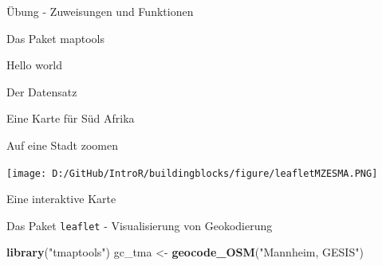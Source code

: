 \documentclass[ignorenonframetext,]{beamer}
\newenvironment{Shaded}{\begin{snugshade}}{\end{snugshade}}
\newcommand{\DataTypeTok}[1]{\textcolor[rgb]{0.74,0.68,0.62}{\underline{#1}}}
\newcommand{\FloatTok}[1]{\textcolor[rgb]{0.27,0.67,0.26}{#1}}
\newcommand{\KeywordTok}[1]{\textcolor[rgb]{0.26,0.66,0.93}{\textbf{#1}}}
\newcommand{\NormalTok}[1]{\textcolor[rgb]{0.74,0.68,0.62}{#1}}
\newcommand{\OperatorTok}[1]{\textcolor[rgb]{0.74,0.68,0.62}{#1}}
\newcommand{\StringTok}[1]{\textcolor[rgb]{0.02,0.61,0.04}{#1}}
\begin{document}
\begin{frame}[fragile]{Übung - Zuweisungen und Funktionen}
\begin{frame}[fragile]{Das Paket maptools}
\begin{frame}[fragile]{Hello world}
\begin{frame}[fragile]{Der Datensatz}
\begin{frame}[fragile]{Eine Karte für Süd Afrika}
\begin{frame}[fragile]{Auf eine Stadt zoomen}
\begin{Shaded}
\end{Shaded}

\texttt{[image: D:/GitHub/IntroR/buildingblocks/figure/leafletMZESMA.PNG]}

\end{frame}

\begin{frame}[fragile]{Eine interaktive Karte}
\protect\hypertarget{eine-interaktive-karte}{}

\begin{Shaded}
\end{Shaded}

\end{frame}

\begin{frame}[fragile]{Das Paket \texttt{leaflet} - Visualisierung von
Geokodierung}
\protect\hypertarget{das-paket-leaflet---visualisierung-von-geokodierung}{}

\begin{Shaded}
\begin{Highlighting}[]
\KeywordTok{library}\NormalTok{(}\StringTok{"tmaptools"}\NormalTok{)}
\NormalTok{gc_tma <-}\StringTok{ }\KeywordTok{geocode_OSM}\NormalTok{(}\StringTok{"Mannheim, GESIS"}\NormalTok{)}
\end{Highlighting}
\end{Shaded}


\end{frame}
\end{frame}
\end{frame}
\end{frame}
\end{frame}
\end{frame}
\end{document}

